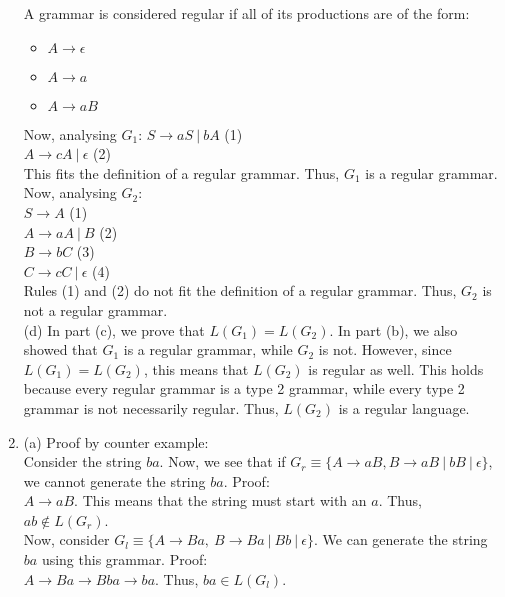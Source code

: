 \documentclass[a4paper]{article}
\begin{document}
\begin{enumerate}
A grammar is considered regular if all of its productions are of the form:
\begin{itemize}
    \item $A\rightarrow \epsilon$
    \item $A\rightarrow a$
    \item $A\rightarrow aB$
\end{itemize}

Now, analysing $G_1$:
$S \rightarrow aS\ |\ bA$ (1)\\
$A \rightarrow cA\ |\ \epsilon$ (2)\\

This fits the definition of a regular grammar. Thus, $G_1$ is a regular grammar.\\

Now, analysing $G_2$:\\
$S \rightarrow A$ (1)\\
$A \rightarrow aA\ |\ B$ (2)\\
$B \rightarrow bC$ (3)\\
$C \rightarrow cC\ |\ \epsilon$ (4)\\

Rules (1) and (2) do not fit the definition of a regular grammar. Thus, $G_2$ is not a regular grammar.\\

(d) In part (c), we prove that $L(G_1) = L(G_2)$. In part (b), we also showed that $G_1$ is a regular grammar, while $G_2$ is not. However, since $L(G_1) = L(G_2)$, this means that $L(G_2)$ is regular as well. This holds because every regular grammar is a type 2 grammar, while every type 2 grammar is not necessarily regular. Thus, $L(G_2)$ is a regular language.\\

\newpage

\item (a) Proof by counter example:\\

Consider the string $ba$. Now, we see that if $G_r \equiv \{A\rightarrow aB, B\rightarrow aB\ |\ bB\ |\ \epsilon\}$, we cannot generate the string $ba$. Proof:\\
$A \rightarrow aB$. This means that the string must start with an $a$. Thus, $ab \notin L(G_r)$.\\

Now, consider $G_l \equiv \{A\rightarrow Ba,\ B\rightarrow Ba\ |\ Bb\ |\ \epsilon\}$. We can generate the string $ba$ using this grammar. Proof:\\
$A \rightarrow Ba \rightarrow Bba \rightarrow ba$. Thus, $ba \in L(G_l)$.\\



\end{enumerate}
\end{document}
